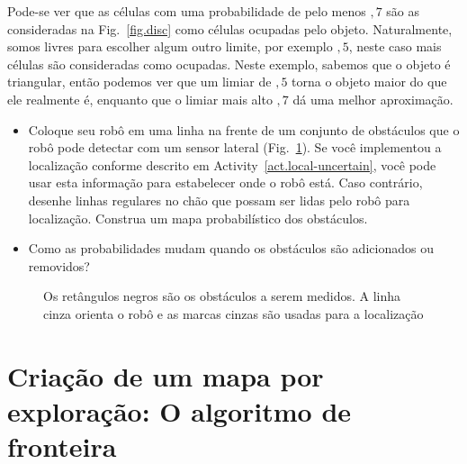 Pode-se ver que as células com uma probabilidade de pelo menos $,7$ são as consideradas na Fig.~\ref{fig.disc} como células ocupadas pelo objeto. Naturalmente, somos livres para escolher algum outro limite, por exemplo $,5$, neste caso mais células são consideradas como ocupadas. Neste exemplo, sabemos que o objeto é triangular, então podemos ver que um limiar de $,5$ torna o objeto maior do que ele realmente é, enquanto que o limiar mais alto $,7$ dá uma melhor aproximação.

\begin{framed}
\begin{itemize}
\item Coloque seu robô em uma linha na frente de um conjunto de obstáculos que o robô pode detectar com um sensor lateral (Fig.~\ref{fig.mapping-activity}). Se você implementou a localização conforme descrito em Activity~\ref{act.local-uncertain}, você pode usar esta informação para estabelecer onde o robô está. Caso contrário, desenhe linhas regulares no chão que possam ser lidas pelo robô para localização. Construa um mapa probabilístico dos obstáculos.
\item Como as probabilidades mudam quando os obstáculos são adicionados ou removidos?
\end{itemize}
\end{framed}

\begin{figure}
\begin{center}
\end{center}
\caption{Os retângulos negros são os obstáculos a serem medidos. A linha cinza orienta o robô e as marcas cinzas são usadas para a localização}\label{fig.mapping-activity}
\end{figure}

\section[O algoritmo de fronteira]{Criação de um mapa por exploração: O algoritmo de fronteira}\label{s.map-create}

